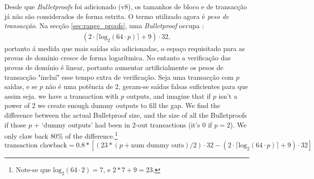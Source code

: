 Desde que {\em Bulletproofs} foi adicionado (v8), os tamanhos de bloco e de transacção já não são considerados de forma estrita. O termo utilizado agora é {\em peso de transacção}.
Na secção \ref{sec:range_proofs}, uma {\em Bulletproof} occupa :
\begin{align*}
(2 \cdot \lceil \textrm{log}_2(64 \cdot p) \rceil + 9) \cdot 32 ,
\end{align*}
portanto á medida que mais saídas são adicionadas, o espaço requisitado para as provas de domínio cresce de forma logarítmica. No entanto a verificação das provas de domínio é linear, portanto aumentar artificialmente os pesos de transacção "incluí" esse tempo extra de verificação. 
\iffalse
Seja uma transacção com $p$ saídas, e se $p$ não é uma potência de 2, geram-se saídas falsas suficientes para que assim seja. 
 we have a transaction with $p$ outputs, and imagine that if $p$ isn't a power of 2 we create enough dummy outputs to fill the gap. We find the difference between the actual Bulletproof size, and the size of all the Bulletproofs if those $p$ + `dummy outputs' had been in 2-out transactions (it's 0 if $p = 2$). 
We only claw back 80\% of the difference.\footnote{Note-se que $\textrm{log}_2(64 \cdot 2) = 7$, e $2*7 + 9 = 23$.}\vspace{.175cm}
\[\textrm{transaction\ clawback} = 0.8*[(23*(p + \textrm{num\ dummy\ outs})/2) \cdot 32 - (2 \cdot \lceil \textrm{log}_2(64 \cdot p) \rceil + 9) \cdot 32]\]

